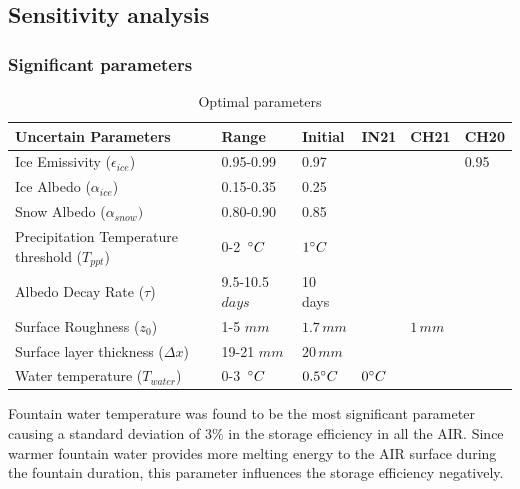 \documentclass[utf8]{frontiersSCNS} %
\begin{document}
\subsection{Sensitivity analysis}
\subsubsection{Significant parameters}

\begin{table}
	\centering
	\caption{Optimal parameters}
	\label{tab:parameters}
	\begin{tabular}{@{}llllll@{}}
		\toprule
		\textbf{Uncertain Parameters}                   & \textbf{Range}    & \textbf{Initial} & \textbf{IN21} & \textbf{CH21} & \textbf{CH20} \\\midrule
		Ice Emissivity ($\epsilon_{ice}$)               & 0.95-0.99         & 0.97             &               &               & 0.95          \\
		Ice Albedo ($\alpha_{ice}$)                     & 0.15-0.35         & 0.25             &               &               &               \\
		Snow Albedo ($\alpha_{snow})$                   & 0.80-0.90         & 0.85             &               &               &               \\
		Precipitation Temperature threshold ($T_{ppt}$) & 0-2 $\,\degree C$ & $1\degree C$     &               &               &               \\
		Albedo Decay Rate ($\tau$)                      & 9.5-10.5 $days$   & 10 days          &               &               &               \\
		Surface Roughness ($z_0$)                       & 1-5 $mm$          & $1.7\,mm$        &               & $1\,mm$       &               \\
		Surface layer thickness ($\Delta x$)            & 19-21 $mm$        & $20\,mm$         &               &               &               \\
		Water temperature ($T_{water}$)                 & 0-3 $\,\degree C$ & $0.5\degree C$   & $0\degree C$  &               &               \\\bottomrule
	\end{tabular}
\end{table}


Fountain water temperature was found to be the most significant parameter causing a standard deviation of $3\%$ in the
storage efficiency in all the AIR. Since warmer fountain water provides more melting energy to the AIR surface during the fountain
duration, this parameter influences the storage efficiency negatively.
\end{document}
